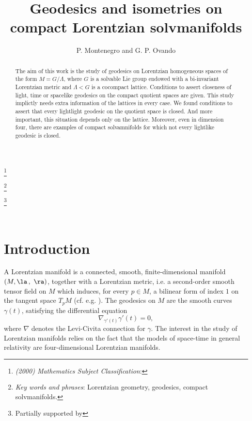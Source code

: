 \documentclass[11pt]{amsart}
\theoremstyle{plain}
\theoremstyle{definition}
\theoremstyle{remark}
\begin{document}
	
	
	\title[Geodesics and isometries on compact Lorentzian solvmanifolds]{Geodesics and isometries on compact Lorentzian solvmanifolds}
	
	\begin{abstract}
		The aim of this work is the study of geodesics on Lorentzian homogeneous spaces of the form $M=G/\Lambda$, where $G$ is a solvable Lie group endowed with a bi-invariant Lorentzian metric and $\Lambda < G$ is a cocompact lattice.   Conditions to assert closeness of light, time or spacelike geodesics on the compact quotient spaces are given. This study implictly needs  extra information of the lattices in every case. We found conditions to assert that every lightlight geodesic on the quotient space is closed. And more important, this  situation depends only on the lattice. Moreover, even in dimension four, there are examples of compact solvamnifolds for which not every lightlike geodesic is closed. 
	\end{abstract}
	
	\author{P. Montenegro and G. P. Ovando}
	
	\let\today\relax  %
	
	\thanks{{\it (2000) Mathematics Subject Classification}:  }
	
	\thanks{{\it Key words and phrases}: Lorentzian geometry, geodesics, compact solvmanifolds. }
	
	\thanks{Partially supported by  }
	
	\address{ Departamento de Matem\'atica, ECEN - FCEIA, Universidad Nacional de Rosario.   Pellegrini 250, 2000 Rosario, Santa Fe, Argentina.}
	
	\
	
	
	
	
	\maketitle
	
	
	
	
	\section{Introduction}
A Lorentzian manifold is a  connected, smooth, finite-dimensional manifold \\ $(M, \la \, , \ \ra)$, together with a Lorentzian metric, i.e. a second-order smooth
tensor field on $M$ which induces, for every $p\in M$, a bilinear form of index $1$ on the tangent
space $T_pM$ (cf. e.g. \cite{ON}). The geodesics on $M$ are the smooth curves $\gamma(t)$, satisfying the
differential equation
$$\nabla_{\gamma'(t)}\gamma'(t)=0,$$
where $\nabla$ denotes the Levi-Civita connection for $\gamma$. 	
	The interest in the study of Lorentzian manifolds relies on the fact that the models of 	space-time in general relativity are four-dimensional Lorentzian manifolds.
	
\end{document}
